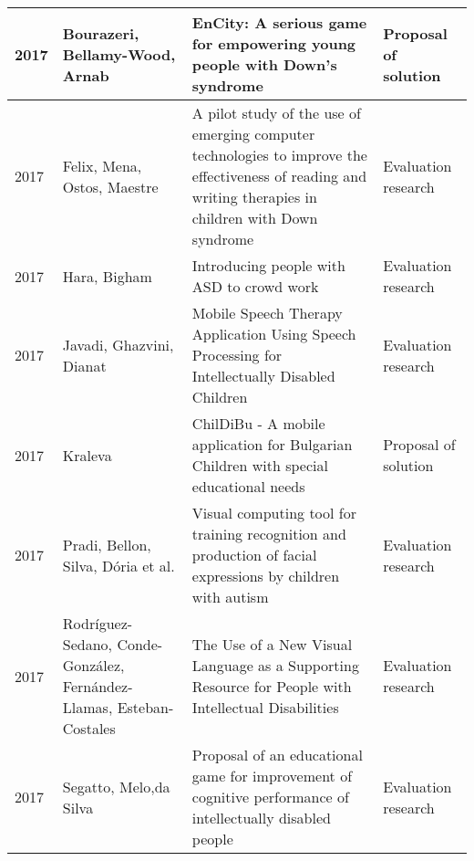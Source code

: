 \documentclass[utf8,english]{gradu3}
\begin{document}
\begin{longtable}{|>{\scriptsize}l|>{\scriptsize}p{3cm}|>{\scriptsize}p{8cm}|>{\scriptsize}p{2.4cm}|}
  2017          & Bourazeri, Bellamy-Wood, Arnab                                       & EnCity: A serious game for empowering young people with Down's syndrome                                                                                                                      & Proposal of solution       \\ \hline
  2017          & Felix, Mena, Ostos, Maestre                                          & A pilot study of the use of emerging computer technologies to improve the effectiveness of reading and writing therapies in children with Down syndrome                                      & Evaluation research        \\ \hline
  2017          & Hara, Bigham                                                         & Introducing people with ASD to crowd work                                                                                                                                                    & Evaluation research        \\ \hline
  2017          & Javadi, Ghazvini, Dianat                                             & Mobile Speech Therapy Application Using Speech Processing for Intellectually Disabled Children                                                                                               & Evaluation research        \\ \hline
  2017          & Kraleva                                                              & ChilDiBu - A mobile application for Bulgarian Children with special educational needs                                                                                                        & Proposal of solution       \\ \hline
  2017          & Pradi, Bellon, Silva, Dória et al.                                   & Visual computing tool for training recognition and production of facial expressions by children with autism                                                                                  & Evaluation research        \\ \hline
  2017          & Rodríguez-Sedano, Conde-González, Fernández-Llamas, Esteban-Costales & The Use of a New Visual Language as a Supporting Resource for People with Intellectual Disabilities                                                                                          & Evaluation research        \\ \hline
  2017          & Segatto, Melo,da Silva                                               & Proposal of an educational game for improvement of cognitive performance of intellectually disabled people                                                                                   & Evaluation research        \\ \hline

\end{longtable}
\end{document}
